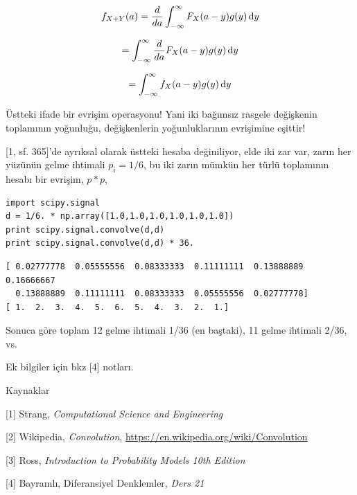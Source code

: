 \documentclass[12pt,fleqn]{article}\usepackage{../../common}
\begin{document}
$$
f_{X+Y}(a) = \frac{d}{da} \int_{-\infty}^{\infty} F_X(a-y) g(y) \,\mathrm{d} y
$$

$$  = \int_{-\infty}^{\infty} \frac{d}{da} F_X(a-y) g(y) \,\mathrm{d} y $$

$$  = \int_{-\infty}^{\infty} f_X(a-y) g(y) \,\mathrm{d} y $$

Üstteki ifade bir evrişim operasyonu! Yani iki bağımsız rasgele değişkenin
toplamının yoğunluğu, değişkenlerin yoğunluklarının evrişimine eşittir!

[1, sf. 365]'de ayrıksal olarak üstteki hesaba değiniliyor, elde iki zar
var, zarın her yüzünün gelme ihtimali $p_i=1/6$, bu iki zarın mümkün her
türlü toplamının hesabı bir evrişim, $p * p$, 

\begin{verbatim}
import scipy.signal
d = 1/6. * np.array([1.0,1.0,1.0,1.0,1.0,1.0])
print scipy.signal.convolve(d,d) 
print scipy.signal.convolve(d,d) * 36.
\end{verbatim}

\begin{verbatim}
[ 0.02777778  0.05555556  0.08333333  0.11111111  0.13888889  0.16666667
  0.13888889  0.11111111  0.08333333  0.05555556  0.02777778]
[ 1.  2.  3.  4.  5.  6.  5.  4.  3.  2.  1.]
\end{verbatim}

Sonuca göre toplam 12 gelme ihtimali 1/36 (en baştaki), 11 gelme ihtimali
2/36, vs.

Ek bilgiler için bkz [4] notları. 

Kaynaklar 

[1] Strang, {\em Computational Science and Engineering}

[2] Wikipedia, {\em Convolution}, \url{https://en.wikipedia.org/wiki/Convolution}

[3] Ross, {\em Introduction to Probability Models 10th Edition}

[4] Bayramlı, Diferansiyel Denklemler, {\em Ders 21}
\end{document}
